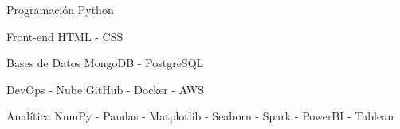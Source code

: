 


\begin{cvskills}


\cvskill
{Programación} %
{Python} %


\cvskill
{Front-end} %
{HTML - CSS} %


\cvskill
{Bases de Datos} %
{MongoDB - PostgreSQL} %


\cvskill
{DevOps - Nube} %
{GitHub - Docker - AWS} %


\cvskill
{Analítica} %
{NumPy - Pandas - Matplotlib - Seaborn - Spark - PowerBI - Tableau} %




\end{cvskills}